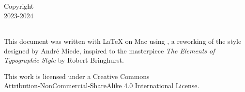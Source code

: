 
\thispagestyle{empty}

\hfill


\begin{center}
\myName \\
\smallskip
\textit{\myTitle}\\
\smallskip
Copyright \ccbyncsa\\
2023-2024
\end{center}

\medskip

\noindent\textsf{} \\
\noindent
This document was written with \LaTeX{} on Mac using \arsclassica, a reworking of the \classicthesis{} style designed by Andr\'e Miede, inspired to the masterpiece \emph{The Elements of Typographic Style} by Robert Bringhurst.

\bigskip

\noindent This work is licensed under a Creative Commons\\
Attribution-NonCommercial-ShareAlike 4.0 International License.

\bigskip

\noindent
\textsf{}

\noindent
{}\,
